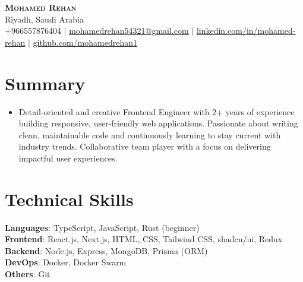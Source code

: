 \documentclass[letterpaper,11pt]{article}
\newcommand{\resumeSubHeadingListStart}{\begin{itemize}[leftmargin=0.15in, label={}]}
\newcommand{\resumeSubHeadingListEnd}{\end{itemize}}
\begin{document}

\begin{center}
    \textbf{\Huge \scshape Mohamed Rehan} \\ \vspace{4pt}
    \normalsize Riyadh, Saudi Arabia \\ \vspace{6pt}
    \small +966557876404 $|$ 
    \href{mailto:mohamedrehan54321@gmail.com}{\underline{mohamedrehan54321@gmail.com}} $|$ 
    \href{https://www.linkedin.com/in/mohamed-rehan/}{\underline{linkedin.com/in/mohamed-rehan}} $|$
    \href{https://www.github.com/mohamedrehan1}{\underline{github.com/mohamedrehan1}}
\end{center}



\section{Summary}
\resumeSubHeadingListStart
  \item
    \small{Detail-oriented and creative Frontend Engineer with 2+ years of experience building responsive, user-friendly web applications. Passionate about writing clean, maintainable code and continuously learning to stay current with industry trends. Collaborative team player with a focus on delivering impactful user experiences.}
\resumeSubHeadingListEnd



\section{Technical Skills}
 \begin{itemize}[leftmargin=0.15in, label={}]
    \small{\item{
     \textbf{Languages}{:  TypeScript, JavaScript, Rust (beginner)} \\
     \textbf{Frontend}{: React.js, Next.js, HTML, CSS, Tailwind CSS, shadcn/ui, Redux} \\
    \textbf{Backend}{: Node.js, Express, MongoDB, Prisma (ORM)} \\
     \textbf{DevOps}{: Docker, Docker Swarm} \\
     \textbf{Others}{: Git}
    }}
 \end{itemize}
\end{document}
